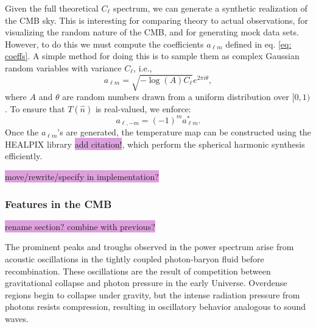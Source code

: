 \documentclass{aa}
\numberwithin{equation}{section}
\numberwithin{table}{section}
\numberwithin{figure}{section}
\begin{document}
Given the full theoretical $C_\ell$ spectrum, we can generate a synthetic realization of the CMB sky. This is interesting for comparing theory to actual observations, for visualizing the random nature of the CMB, and for generating mock data sets. However, to do this we must compute the coefficients $a_{\ell m}$ defined in eq. \eqref{eq: coeffs}.
A simple method for doing this is to sample them as complex Gaussian random variables with variance $C_\ell$, i.e.,
\begin{equation}
    a_{\ell m} = \sqrt{-\log (A) C_\ell} e^{2\pi i \theta},
\end{equation}
where $A$ and $\theta$ are random numbers drawn from a uniform distribution over $[0,1)$. To ensure that $T(\hat{n})$ is real-valued, we enforce:
\begin{equation}
    a_{\ell, -m} = (-1)^m a_{\ell m}^*.
\end{equation}
Once the $a_{\ell m}$'s are generated, the temperature map can be constructed using the HEALPIX library \colorbox{Plum}{add citation!}, which perform the spherical harmonic synthesis efficiently. 

\colorbox{Plum}{move/rewrite/specify in implementation?}


\subsubsection{Features in the CMB}
\colorbox{Plum}{rename section? combine with previous?}

The prominent peaks and troughs observed in the power spectrum arise from acoustic oscillations in the tightly coupled photon-baryon fluid before recombination. These oscillations are the result of competition between gravitational collapse and photon pressure in the early Universe. Overdense regions begin to collapse under gravity, but the intense radiation pressure from photons resists compression, resulting in oscillatory behavior analogous to sound waves.
\end{document}
